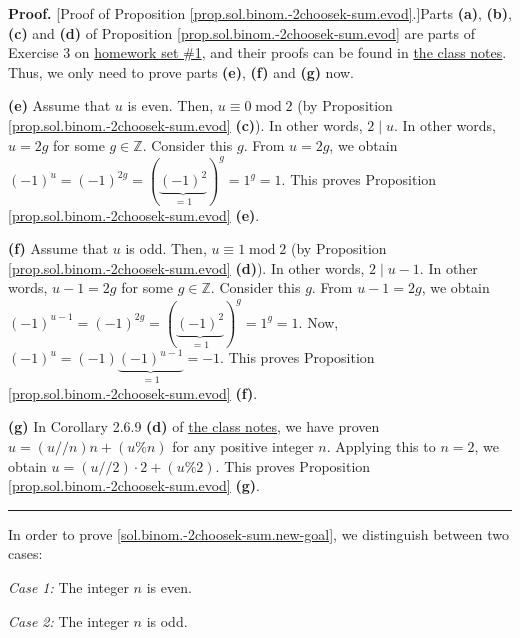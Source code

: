 \documentclass[paper=a4, fontsize=12pt]{scrartcl}%
\theoremstyle{plainsl}
\theoremstyle{definition}
\theoremstyle{remark}
\newenvironment{proof}[1][Proof]{\noindent\textbf{#1.} }{\ \rule{0.5em}{0.5em}}
\begin{document}
\begin{proof}
[Proof of Proposition \ref{prop.sol.binom.-2choosek-sum.evod}.]Parts
\textbf{(a)}, \textbf{(b)}, \textbf{(c)} and \textbf{(d)} of Proposition
\ref{prop.sol.binom.-2choosek-sum.evod} are parts of Exercise 3 on
\href{http://www.cip.ifi.lmu.de/~grinberg/t/19s/hw1s.pdf}{homework set \#1},
and their proofs can be found in
\href{http://www.cip.ifi.lmu.de/~grinberg/t/19s/notes.pdf}{the class notes}.
Thus, we only need to prove parts \textbf{(e)}, \textbf{(f)} and \textbf{(g)} now.

\textbf{(e)} Assume that $u$ is even. Then, $u\equiv0\operatorname{mod}2$
(by Proposition \ref{prop.sol.binom.-2choosek-sum.evod} \textbf{(c)}). In
other words, $2\mid u$. In other words, $u=2g$ for some $g\in\mathbb{Z}$.
Consider this $g$. From $u=2g$, we obtain $\left(  -1\right)  ^{u}=\left(
-1\right)  ^{2g}=\left(  \underbrace{\left(  -1\right)  ^{2}}_{=1}\right)
^{g}=1^{g}=1$. This proves Proposition \ref{prop.sol.binom.-2choosek-sum.evod}
\textbf{(e)}.

\textbf{(f)} Assume that $u$ is odd. Then, $u\equiv1\operatorname{mod}2$
(by Proposition \ref{prop.sol.binom.-2choosek-sum.evod} \textbf{(d)}). In
other words, $2\mid u-1$. In other words, $u-1=2g$ for some $g\in\mathbb{Z}$.
Consider this $g$. From $u-1=2g$, we obtain $\left(  -1\right)  ^{u-1}=\left(
-1\right)  ^{2g}=\left(  \underbrace{\left(  -1\right)  ^{2}}_{=1}\right)
^{g}=1^{g}=1$. Now, $\left(  -1\right)  ^{u}=\left(  -1\right)
\underbrace{\left(  -1\right)  ^{u-1}}_{=1}=-1$. This proves Proposition
\ref{prop.sol.binom.-2choosek-sum.evod} \textbf{(f)}.

\textbf{(g)} In Corollary 2.6.9 \textbf{(d)} of
\href{http://www.cip.ifi.lmu.de/~grinberg/t/19s/notes.pdf}{the class notes},
we have proven $u=\left(  u//n\right)
n+\left(  u\%n\right)  $ for any positive integer $n$. Applying this to $n=2$,
we obtain $u=\left(  u//2\right)  \cdot2+\left(  u\%2\right)  $. This proves
Proposition \ref{prop.sol.binom.-2choosek-sum.evod} \textbf{(g)}.
\end{proof}

In order to prove \eqref{sol.binom.-2choosek-sum.new-goal}, we distinguish
between two cases:

\textit{Case 1:} The integer $n$ is even.

\textit{Case 2:} The integer $n$ is odd.
\end{document}
